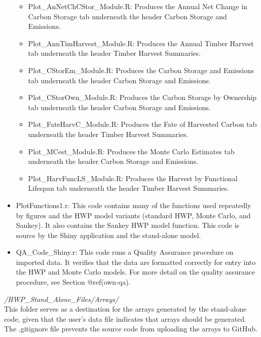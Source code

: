 \documentclass[
  openany]{book}
\providecommand{\tightlist}{%
  \setlength{\itemsep}{0pt}\setlength{\parskip}{0pt}}
\begin{document}
\begin{itemize}
  \begin{itemize}
  \tightlist
  \item
    Plot\_AnNetChCStor\_Module.R: Produces the Annual Net Change in
    Carbon Storage tab underneath the header Carbon Storage and
    Emissions.\\
  \item
    Plot\_AnnTimHarvest\_Module.R: Produces the Annual Timber Harvest
    tab underneath the header Timber Harvest Summaries.\\
  \item
    Plot\_CStorEm\_Module.R: Produces the Carbon Storage and Emissions
    tab underneath the header Carbon Storage and Emissions.\\
  \item
    Plot\_CStorOwn\_Module.R: Produces the Carbon Storage by Ownership
    tab underneath the header Carbon Storage and Emissions.\\
  \item
    Plot\_FateHarvC\_Module.R: Produces the Fate of Harvested Carbon tab
    underneath the header Timber Harvest Summaries.\\
  \item
    Plot\_MCest\_Module.R: Produces the Monte Carlo Estimates tab
    underneath the header Carbon Storage and Emissions.\\
  \item
    Plot\_HarvFuncLS\_Module.R: Produces the Harvest by Functional
    Lifespan tab underneath the header Timber Harvest Summaries.
  \end{itemize}
\item
  PlotFunctions1.r: This code contains many of the functions used
  repeatedly by figures and the HWP model variants (standard HWP, Monte
  Carlo, and Sankey). It also contains the Sankey HWP model function.
  This code is source by the Shiny application and the stand-alone
  model.
\item
  QA\_Code\_Shiny.r: This code runs a Quality Assurance procedure on
  imported data. It verifies that the data are formatted correctly for
  entry into the HWP and Monte Carlo models. For more detail on the
  quality assurance procedure, see Section @ref(own-qa).
\end{itemize}

\emph{/HWP\_Stand\_Alone\_Files/Arrays/}\\
This folder serves as a destination for the arrays generated by the
stand-alone code, given that the user's data file indicates that arrays
should be generated. The .gitignore file prevents the source code from
uploading the arrays to GitHub.
\end{document}
